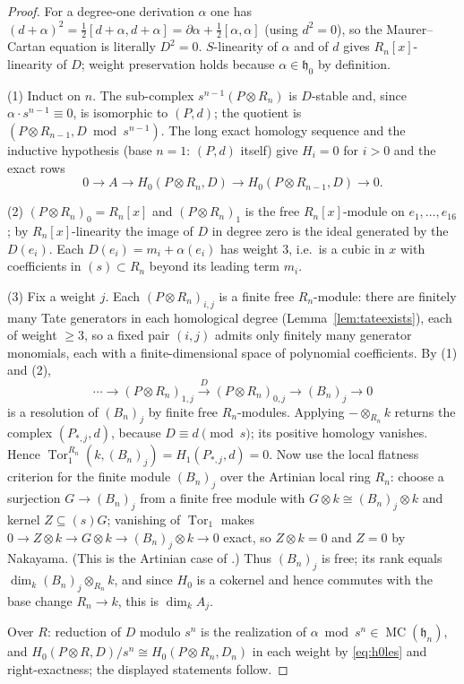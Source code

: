\documentclass[11pt]{article}
\theoremstyle{definition}
\theoremstyle{remark}
\newcommand{\MC}{\operatorname{MC}}
\newcommand{\Tor}{\operatorname{Tor}}
\newcommand{\h}{\mathfrak h}
\begin{document}
\begin{proof}
For a degree-one derivation $\alpha$ one has
$(d+\alpha)^2=\tfrac12[d+\alpha,d+\alpha]
=\partial\alpha+\tfrac12[\alpha,\alpha]$ (using $d^2=0$), so the
Maurer--Cartan equation is literally $D^2=0$.  $S$-linearity of $\alpha$ and
of $d$ gives $R_n[x]$-linearity of $D$; weight preservation holds because
$\alpha\in\h_0$ by definition.

(1) Induct on $n$.  The sub-complex $s^{n-1}(P\otimes R_n)$ is $D$-stable
and, since $\alpha\cdot s^{n-1}\equiv0$, is isomorphic to $(P,d)$; the
quotient is $(P\otimes R_{n-1},D\bmod s^{n-1})$.  The long exact homology
sequence and the inductive hypothesis (base $n=1$: $(P,d)$ itself) give
$H_i=0$ for $i>0$ and the exact rows
\[
 0\to A\to H_0(P\otimes R_n,D)\to H_0(P\otimes R_{n-1},D)\to0 .
\tag{3.2}\label{eq:h0les}
\]

(2) $(P\otimes R_n)_0=R_n[x]$ and $(P\otimes R_n)_1$ is the free
$R_n[x]$-module on $e_1,\ldots,e_{16}$; by $R_n[x]$-linearity the image of
$D$ in degree zero is the ideal generated by the $D(e_i)$.  Each
$D(e_i)=m_i+\alpha(e_i)$ has weight $3$, i.e.\ is a cubic in $x$ with
coefficients in $(s)\subset R_n$ beyond its leading term $m_i$.

(3) Fix a weight $j$.  Each $(P\otimes R_n)_{i,j}$ is a finite free
$R_n$-module: there are finitely many Tate generators in each homological
degree (Lemma~\ref{lem:tateexists}), each of weight $\geq3$, so a fixed
pair $(i,j)$ admits only finitely many generator monomials, each with a
finite-dimensional space of polynomial coefficients.  By (1) and (2),
\[
 \cdots\to(P\otimes R_n)_{1,j}\xrightarrow{\;D\;}
 (P\otimes R_n)_{0,j}\to(B_n)_j\to0
\]
is a resolution of $(B_n)_j$ by finite free $R_n$-modules.  Applying
$-\otimes_{R_n}k$ returns the complex $(P_{\ast,j},d)$, because
$D\equiv d\pmod s$; its positive homology vanishes.  Hence
$\Tor^{R_n}_1(k,(B_n)_j)=H_1(P_{\ast,j},d)=0$.  Now use the local flatness
criterion for the finite module $(B_n)_j$ over the Artinian local ring
$R_n$: choose a surjection $G\to(B_n)_j$ from a finite free module with
$G\otimes k\cong(B_n)_j\otimes k$ and kernel $Z\subseteq(s)G$; vanishing of
$\Tor_1$ makes $0\to Z\otimes k\to G\otimes k\to(B_n)_j\otimes k\to0$ exact,
so $Z\otimes k=0$ and $Z=0$ by Nakayama.  (This is the Artinian case of
\cite[Tag 00MK]{Stacks00MK}.)  Thus $(B_n)_j$ is free; its rank equals
$\dim_k(B_n)_j\otimes_{R_n}k$, and since $H_0$ is a cokernel and hence
commutes with the base change $R_n\to k$, this is $\dim_kA_j$.

Over $R$: reduction of $D$ modulo $s^n$ is the realization of
$\alpha\bmod s^n\in\MC(\h_n)$, and
$H_0(P\otimes R,D)/s^n\cong H_0(P\otimes R_n,D_n)$ in each weight by
\eqref{eq:h0les} and right-exactness; the displayed statements follow.
\end{proof}
\end{document}
